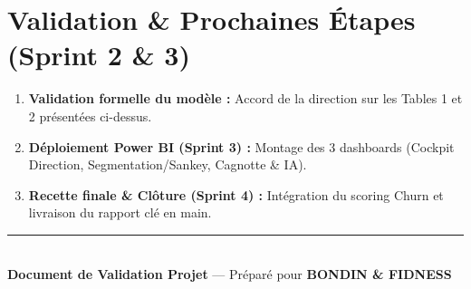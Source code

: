\documentclass[11pt,a4paper]{article}
\begin{document}
\vspace{0.6cm}

\section*{\textcolor{fidnessblue}{Validation \& Prochaines Étapes (Sprint 2 \& 3)}}
\begin{enumerate}
    \item \textbf{Validation formelle du modèle :} Accord de la direction sur les Tables 1 et 2 présentées ci-dessus.
    \item \textbf{Déploiement Power BI (Sprint 3) :} Montage des 3 dashboards (Cockpit Direction, Segmentation/Sankey, Cagnotte \& IA).
    \item \textbf{Recette finale \& Clôture (Sprint 4) :} Intégration du scoring Churn et livraison du rapport clé en main.
\end{enumerate}

\vspace{0.8cm}
\begin{center}
    \rule{0.6\linewidth}{0.6pt}\\[0.2cm]
    \small \textbf{Document de Validation Projet} --- Préparé pour \textbf{BONDIN \& FIDNESS}
\end{center}
\end{document}

